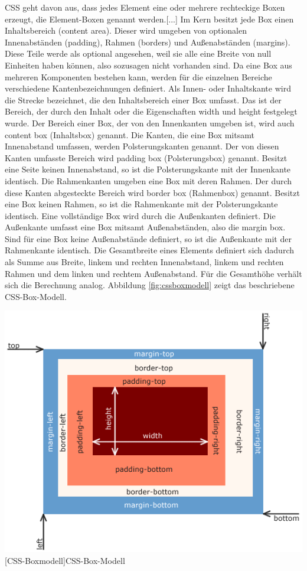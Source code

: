 \documentclass[12pt,a4paper,bibliography=totocnumbered,listof=totocnumbered]{scrartcl}
\begin{document}
\glqq CSS geht davon aus, dass jedes Element eine oder mehrere rechteckige Boxen erzeugt, die Element-Boxen genannt werden.[...] Im Kern besitzt jede Box einen Inhaltsbereich (content area). Dieser wird umgeben von optionalen Innenabständen (padding), Rahmen (borders) und Außenabständen (margins). Diese Teile werde als optional angesehen, weil sie alle eine Breite von null Einheiten haben können, also sozusagen nicht vorhanden sind.\grqq{}\cite[S.167]{MeyeCasc2005} \glqq Da eine Box aus mehreren Komponenten bestehen kann, werden für die einzelnen Bereiche verschiedene Kantenbezeichnungen definiert. Als Innen- oder Inhaltskante wird die Strecke bezeichnet, die den Inhaltsbereich einer Box umfasst. Das ist der Bereich, der durch den Inhalt oder die Eigenschaften width und height festgelegt wurde. Der Bereich einer Box, der von den Innenkanten umgeben ist, wird auch content box (Inhaltsbox) genannt. Die Kanten, die eine Box mitsamt Innenabstand umfassen, werden Polsterungskanten genannt. Der von diesen Kanten umfasste Bereich wird padding box (Polsterungsbox) genannt. Besitzt eine Seite keinen Innenabstand, so ist die Polsterungskante mit der Innenkante identisch. Die Rahmenkanten umgeben eine Box mit deren Rahmen. Der durch diese Kanten abgesteckte Bereich wird border box (Rahmenbox) genannt. Besitzt eine Box keinen Rahmen, so ist die Rahmenkante mit der Polsterungskante identisch. Eine vollständige Box wird durch die Außenkanten definiert. Die Außenkante umfasst eine Box mitsamt Außenabständen, also die margin box. Sind für eine Box keine Außenabstände definiert, so ist die Außenkante mit der Rahmenkante identisch.\grqq{}\cite{SelfHtml20145} Die Gesamtbreite eines Elements definiert sich dadurch als Summe aus Breite, linkem und rechten Innenabstand, linkem und rechten Rahmen und dem linken und rechtem Außenabstand. Für die Gesamthöhe verhält sich die Berechnung analog. Abbildung \ref{fig:cssboxmodell} zeigt das beschriebene CSS-Box-Modell.

	\vspace{1em}
	\begin{minipage}{\linewidth}
		\centering
		\includegraphics[width=0.8\linewidth]{images/css_boxmodell.png}
		[CSS-Boxmodell]{CSS-Box-Modell\cite{WikiCSS2014} }
		\label{fig:cssboxmodell}
	\end{minipage}
	
\end{document}
